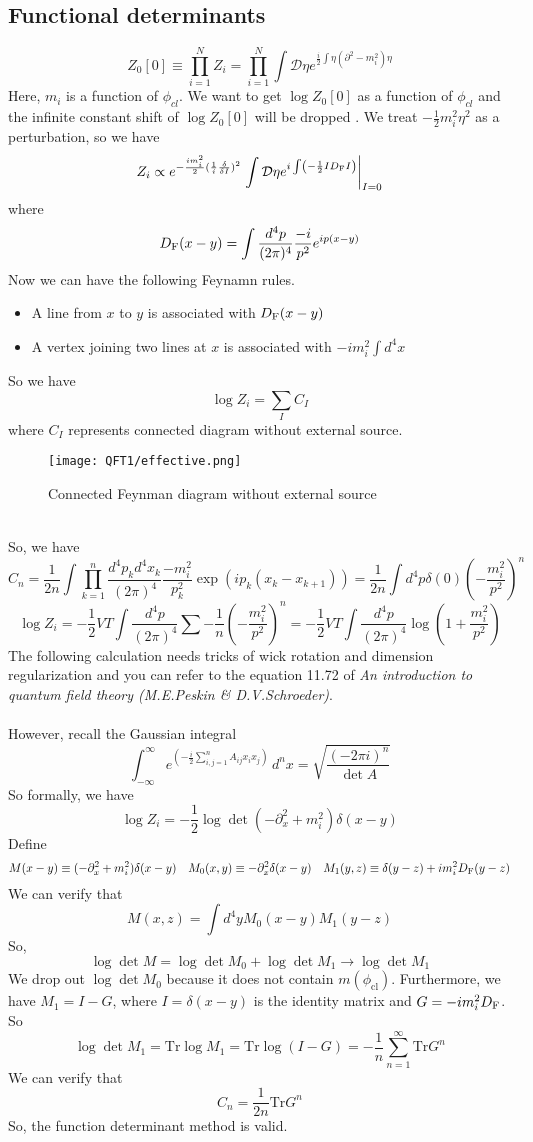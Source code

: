 \subsection{Functional determinants}
\[Z_0[0] \equiv \prod_{i=1}^{N} Z_i  = \prod_{i=1}^{N} \int \mathcal{D}\eta e^{ \frac{i}{2}\int \eta \left( \partial^2-m_i^2\right) \eta }\]
Here, $m_i$ is a function of $\phi_{cl}$. We want to get $\log Z_0[0]$ as a function of $\phi_{cl}$ and the  infinite constant shift of $\log Z_0[0]$ will be dropped . We treat $-\frac{1}{2}m_i^2\eta^2$ as a perturbation, so we have
\[Z_i \propto e^{-\frac{im_i^2}{2}(\frac{1}{i} \frac{\delta}{\delta I})^2} \left. \int \mathcal{D}\eta e^{i\int \left(-\frac{1}{2} I D_{\rm F} I \right)} \right|_{I=0}\] 
where
\[D_{\rm F}(x-y) = \int \frac{d^4p}{(2\pi)^4} \frac{-i}{p^2}e^{ip(x-y)}\]
Now we can have the following Feynamn rules.
\begin{itemize}
\item A line from $x$ to $y$ is associated with $D_{\rm F}(x-y)$
\item A vertex joining two lines at $x$ is associated with $-im_i^2\int d^4x$
\end{itemize}
So we have
\[\log Z_i = \sum_{I}C_I\]
where $C_I$ represents connected diagram without external source.
\\
\begin{figure}[!h]
\centering
\texttt{[image: QFT1/effective.png]}
\caption{Connected Feynman diagram without external source}
\end{figure}
\\
So, we have
\[C_n = \frac{1}{2n}\int \prod_{k=1}^{n} \frac{d^4p_k d^4x_k}{(2\pi)^4} \frac{-m_i^2}{p_k^2} \exp(ip_k(x_k-x_{k+1})) = \frac{1}{2n} \int d^4p \delta(0) \left(-\frac{m_i^2}{p^2} \right)^n\] 
\[\log Z_i = -\frac{1}{2}VT \int \frac{d^4p}{(2\pi)^4} \sum -\frac{1}{n} \left(-\frac{m_i^2}{p^2} \right)^n = -\frac{1}{2}VT\int  \frac{d^4p}{(2\pi)^4} \log(1+\frac{m_i^2}{p^2})\]
The following calculation needs tricks of wick rotation and dimension regularization and you can refer to the equation 11.72 of \emph{An introduction to quantum field theory (M.E.Peskin \& D.V.Schroeder)}.
\\ \\
However, recall the Gaussian integral
\[\int _{-\infty }^{\infty }e^{\left(-{\frac {i}{2}}\sum \limits _{i,j=1}^{n}A_{ij}x_{i}x_{j}\right)}\,d^{n}x
= {\sqrt {\frac {(-2\pi i)^{n}}{\det A}}} \]
So formally, we have
\[\log Z_i = -\frac{1}{2}\log \det (-\partial_x^2 + m_i^2)\delta(x-y)\]
Define
\[M(x-y) \equiv (-\partial_x^2 + m_i^2)\delta(x-y) \quad M_0(x,y) \equiv -\partial_x^2\delta(x-y) \quad M_1(y,z) \equiv \delta(y-z) + im_i^2D_{\rm F}(y-z)\]
We can verify that
\[M(x,z) = \int d^4y M_0(x-y)M_1(y-z)\]
So, 
\[\log \det M = \log \det M_0 + \log \det M_1 \to \log \det M_1\]
We drop out $\log \det M_0$ because it does not contain $m(\phi_{\mathrm{cl}})$. Furthermore, we have $M_1 = I - G$, where $I = \delta(x-y)$ is the identity matrix and $G = -im_i^2D_{\rm F}$. So
\[\log \det M_1 =  \mathrm{Tr} \log M_1 = \mathrm{Tr} \log(I-G) = -\frac{1}{n}\sum_{n=1}^{\infty} \mathrm{Tr} G^n\]
We can verify that
\[C_n = \frac{1}{2n} \mathrm{Tr} G^n\]
So, the function determinant method is valid.

